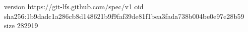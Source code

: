 version https://git-lfs.github.com/spec/v1
oid sha256:1b9dadc1a286cb8d148621b9f9faf39de81f1bea3fada738b004be0e97e28b59
size 282919
